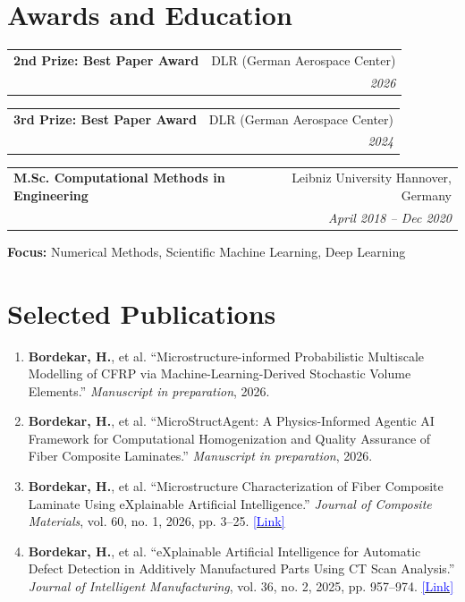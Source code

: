 \documentclass[a4paper,20pt]{article}
\makeatletter
\newcommand{\resumeSubheading}[4]{
  \vspace{-1pt}\item
    \begin{tabular*}{0.97\textwidth}{l@{\extracolsep{\fill}}r}
      \textbf{#1} & #2 \\
      \textit{#3} & \textit{#4} \\
    \end{tabular*}\vspace{-5pt}
}
\makeatother
\begin{document}
\vspace{0.2cm}
\vspace{5pt}

\newpage

\section{\color{blue}Awards and Education}

\resumeSubheading
  {\textcolor{green!50!black}{\faAward} \textbf{2nd Prize: Best Paper Award}}
  {DLR (German Aerospace Center)}{}{2026}
\resumeSubheading
  {\textcolor{green!50!black}{\faAward} \textbf{3rd Prize: Best Paper Award}}
  {DLR (German Aerospace Center)}{}{2024}
\vspace{4pt}

\resumeSubheading
  {\textcolor{green!50!black}{M.Sc.} Computational Methods in Engineering}
  {Leibniz University Hannover, Germany}{}{April 2018 -- Dec 2020}
  \vspace{2pt}
\textbf{Focus:} Numerical Methods, Scientific Machine Learning, Deep Learning
\vspace{4pt}
\section{\color{blue}Selected Publications}

\begin{enumerate}

  \item \textbf{Bordekar, H.}, et al.
  ``Microstructure-informed Probabilistic Multiscale Modelling of CFRP via Machine-Learning-Derived Stochastic Volume Elements.''
  \textit{Manuscript in preparation}, 2026.

  \item \textbf{Bordekar, H.}, et al.
  ``MicroStructAgent: A Physics-Informed Agentic AI Framework for Computational Homogenization and Quality Assurance of Fiber Composite Laminates.''
  \textit{Manuscript in preparation}, 2026.

  \item \textbf{Bordekar, H.}, et al.
  ``Microstructure Characterization of Fiber Composite Laminate Using eXplainable Artificial Intelligence.''
  \textit{Journal of Composite Materials}, vol. 60, no. 1, 2026, pp. 3--25.
  \href{https://journals.sagepub.com/doi/pdf/10.1177/00219983251345559}{\textcolor{blue}{[Link]}}

  \item \textbf{Bordekar, H.}, et al.
  ``eXplainable Artificial Intelligence for Automatic Defect Detection in Additively Manufactured Parts Using CT Scan Analysis.''
  \textit{Journal of Intelligent Manufacturing}, vol. 36, no. 2, 2025, pp. 957--974.
  \href{https://link.springer.com/article/10.1007/s10845-023-02272-4}{\textcolor{blue}{[Link]}}

\end{enumerate}
\vspace{2pt}
\end{document}
